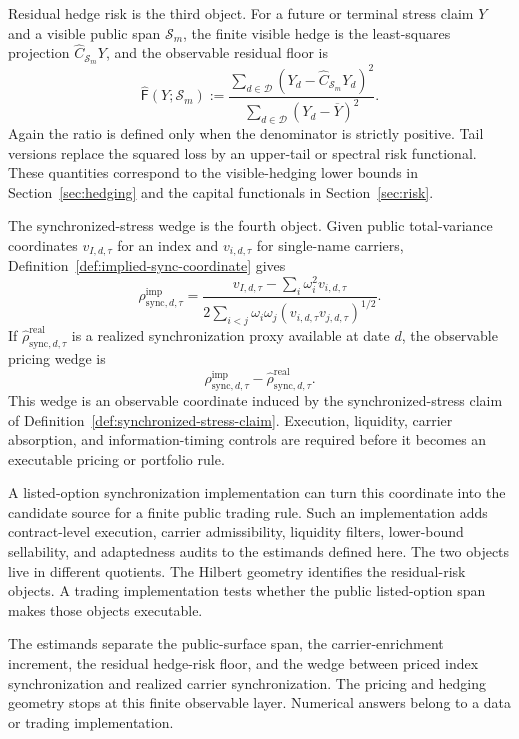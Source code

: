 \documentclass[11pt,a4paper]{amsart}
\theoremstyle{plain}
\theoremstyle{definition}
\theoremstyle{remark}
\newcommand{\cD}{\mathcal{D}}
\newcommand{\cS}{\mathcal{S}}
\begin{document}
Residual hedge risk is the third object.  For a future or terminal stress claim \(Y\) and a
visible public span \(\cS_m\), the finite visible hedge is the least-squares projection
\(\widehat C_{\cS_m}Y\), and the observable residual floor is
\[
        \widehat{\mathsf F}(Y;\cS_m)
        :=
        \frac{\sum_{d\in\cD}(Y_d-\widehat C_{\cS_m}Y_d)^2}
             {\sum_{d\in\cD}(Y_d-\overline Y)^2}.
\]
Again the ratio is defined only when the denominator is strictly positive.  Tail versions replace
the squared loss by an upper-tail or spectral risk functional.  These quantities correspond to the
visible-hedging lower bounds in Section~\ref{sec:hedging} and the capital functionals in
Section~\ref{sec:risk}.

The synchronized-stress wedge is the fourth object.  Given public total-variance coordinates
\(v_{I,d,\tau}\) for an index and \(v_{i,d,\tau}\) for single-name carriers,
Definition~\ref{def:implied-sync-coordinate} gives
\[
        \rho_{\mathrm{sync},d,\tau}^{\mathrm{imp}}
        =
        \frac{
        v_{I,d,\tau}-\sum_i\omega_i^2v_{i,d,\tau}
        }{
        2\sum_{i<j}\omega_i\omega_j(v_{i,d,\tau}v_{j,d,\tau})^{1/2}
        }.
\]
If \(\widehat\rho_{\mathrm{sync},d,\tau}^{\mathrm{real}}\) is a realized synchronization proxy
available at date \(d\), the observable pricing wedge is
\[
        \rho_{\mathrm{sync},d,\tau}^{\mathrm{imp}}
        -
        \widehat\rho_{\mathrm{sync},d,\tau}^{\mathrm{real}}.
\]
This wedge is an observable coordinate induced by the synchronized-stress claim of
Definition~\ref{def:synchronized-stress-claim}.  Execution, liquidity, carrier absorption, and
information-timing controls are required before it becomes an executable pricing or portfolio rule.

A listed-option synchronization implementation can turn this coordinate into the candidate source
for a finite public trading rule.  Such an implementation adds contract-level execution, carrier
admissibility, liquidity filters, lower-bound sellability, and adaptedness audits to the estimands
defined here.  The two objects live in different quotients.  The Hilbert geometry identifies the
residual-risk objects.  A trading implementation tests whether the public listed-option span makes
those objects executable.

The estimands separate the public-surface span, the carrier-enrichment increment, the residual
hedge-risk floor, and the wedge between priced index synchronization and realized carrier
synchronization.  The pricing and hedging geometry stops at this finite observable layer.  Numerical
answers belong to a data or trading implementation.
\end{document}

